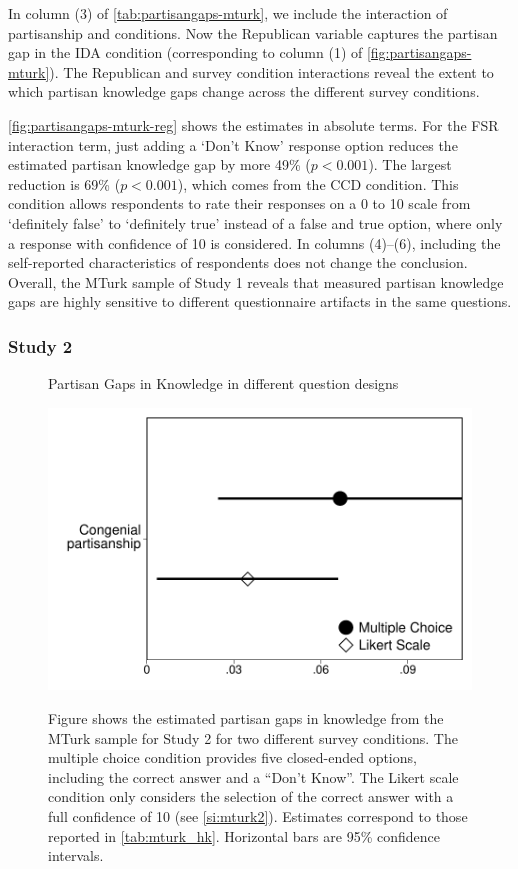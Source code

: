 \documentclass[12pt, letterpaper]{article}
\begin{document}
In column (3) of \cref{tab:partisangaps-mturk}, we include the interaction of partisanship and conditions. Now the Republican variable captures the partisan gap in the IDA condition (corresponding to column (1) of \cref{fig:partisangaps-mturk}). The Republican and survey condition interactions reveal the extent to which partisan knowledge gaps change across the different survey conditions. 

\cref{fig:partisangaps-mturk-reg} shows the estimates in absolute terms. For the FSR interaction term, just adding a `Don't Know' response option reduces the estimated partisan knowledge gap by more 49\% ($p<0.001$).
The largest reduction is 69\% ($p<0.001$), which comes from the CCD condition. This condition allows respondents to rate their responses on a 0 to 10 scale from `definitely false' to `definitely true' instead of a false and true option, where only a response with confidence of 10 is considered. In columns (4)--(6), including the self-reported characteristics of respondents does not change the conclusion. Overall, the MTurk sample of Study 1 reveals that measured partisan knowledge gaps are highly sensitive to different questionnaire artifacts in the same questions.


\subsubsection*{Study 2}
\begin{center}
	\begin{figure}[h]
		\centering
		\caption{Partisan Gaps in Knowledge in different question designs}
		\includegraphics[width=.55\textwidth]{../figs/mturk-hk-MC-LIKERT.pdf}
		\label{fig:mturk_hk}
		\caption*{\scriptsize 
			Figure shows the estimated partisan gaps in knowledge from the MTurk sample for Study 2 for two different survey conditions.
			The multiple choice condition provides five closed-ended options, including the correct answer and a ``Don't Know''.
			The Likert scale condition only considers the selection of the correct answer with a full confidence of 10 (see \cref{si:mturk2}). 
			Estimates correspond to those reported in \cref{tab:mturk_hk}.
			Horizontal bars are 95\% confidence intervals.
		}
	\end{figure}
\end{center}
\end{document}
